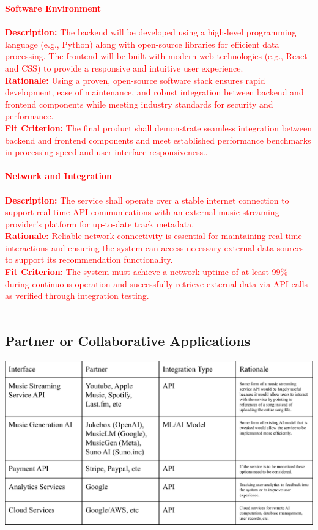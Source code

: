 \documentclass[12pt]{article}
\begin{document}
\noindent \textcolor{red}{\textbf{Software Environment}} \\
\\ \textcolor{red}{\textbf{Description:} The backend will be developed using a high-level programming language (e.g., Python) 
along with open-source libraries for efficient data processing. The frontend will be built with modern web technologies 
(e.g., React and CSS) to provide a responsive and intuitive user experience.}
\\ \textcolor{red}{\textbf{Rationale:} Using a proven, open-source software stack ensures rapid development, ease of maintenance, 
and robust integration between backend and frontend components while meeting industry standards for security and performance.}
\\ \textcolor{red}{\textbf{Fit Criterion:} The final product shall demonstrate seamless integration between backend and frontend components 
and meet established performance benchmarks in processing speed and user interface responsiveness..}
\\ \\

\noindent \textcolor{red}{\textbf{Network and Integration}} \\
\\ \textcolor{red}{\textbf{Description:} The service shall operate over a stable internet connection to support real-time API communications 
with an external music streaming provider’s platform for up-to-date track metadata.}
\\ \textcolor{red}{\textbf{Rationale:} Reliable network connectivity is essential for maintaining real-time interactions and ensuring the 
system can access necessary external data sources to support its recommendation functionality.}
\\ \textcolor{red}{\textbf{Fit Criterion:} The system must achieve a network uptime of at least 99\% during continuous operation and 
successfully retrieve external data via API calls as verified through integration testing.}
\\ \\

\subsection{Partner or Collaborative Applications}
\includegraphics[scale=0.72]{3_3_partner_constraints_figure}
\end{document}
